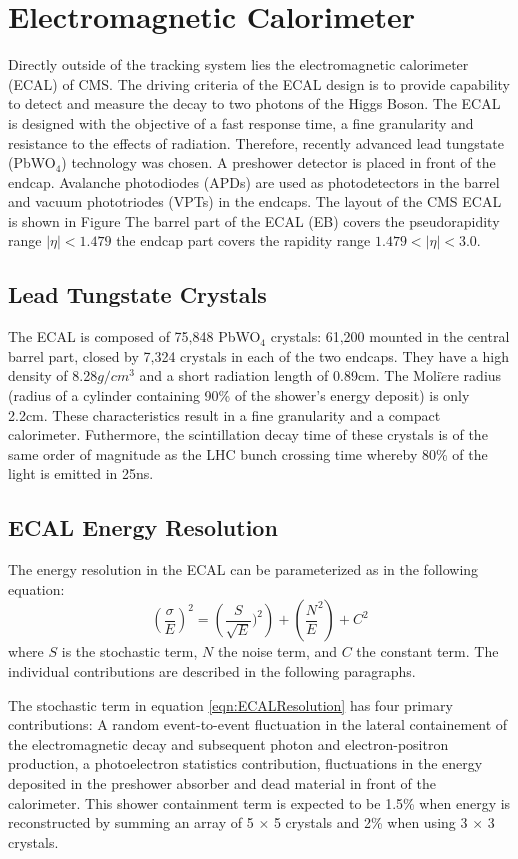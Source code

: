  \section{Electromagnetic Calorimeter}
Directly outside of the tracking system lies the electromagnetic calorimeter 
(ECAL) of CMS. The driving criteria of the ECAL design is to provide capability
to detect and measure the decay to two photons of the Higgs Boson. The 
ECAL is designed with the objective of a
fast response time, a fine granularity and resistance to the effects of radiation.
Therefore, recently advanced lead tungstate (PbWO$_{4}$) technology was chosen. 
A preshower detector is placed in front of the endcap. Avalanche photodiodes (APDs)
are used as photodetectors in the barrel and vacuum phototriodes (VPTs) in the
endcaps.
The layout of the CMS ECAL is shown in Figure %
The barrel part of the ECAL (EB) covers the pseudorapidity range $|\eta|<1.479$
the endcap part covers the rapidity range $1.479<|\eta|<3.0$.
\subsection{Lead Tungstate Crystals}
The ECAL is composed of 75,848 PbWO$_{4}$ crystals: 61,200 mounted in the 
central barrel part, closed by 7,324 crystals in each of the two endcaps. They 
have a high density of 8.28$g/cm^{3}$ and a short radiation length of 0.89cm. 
The Moli$\grave{e}$re radius (radius of a cylinder containing 90\% of the shower's energy deposit) 
is only 2.2cm. These characteristics result in a fine granularity and a compact
calorimeter. Futhermore, the scintillation decay time of these crystals is of the
same order of magnitude as the LHC bunch crossing time whereby 80\% of 
the light is emitted in 25ns. 
\subsection{ECAL Energy Resolution}
The energy resolution in the ECAL can be parameterized as in the following equation:
\begin{displaymath}
\left(\frac{\sigma}{E}\right)^{2}=\left(\frac{S}{\sqrt{E}})^{2}\right)+\left(\frac{N}{E}^{2}\right)+C^{2}
\label{eqn:ECALResolution}
\end{displaymath}
where $S$ is the stochastic term, $N$ the noise term, and $C$ the constant term. 
The individual contributions are described in the following paragraphs.

The stochastic term in equation \ref{eqn:ECALResolution} has four primary contributions:%
A random event-to-event fluctuation in the lateral containement of the
electromagnetic decay and subsequent photon and electron-positron production,
a photoelectron statistics contribution, fluctuations in the energy
deposited in the preshower absorber and dead material in front of the calorimeter. %
This shower containment term is expected to be 1.5\% when energy is 
reconstructed by summing an array of 5 $\times$ 5 crystals and 2\%
when using 3 $\times$ 3 crystals. 

